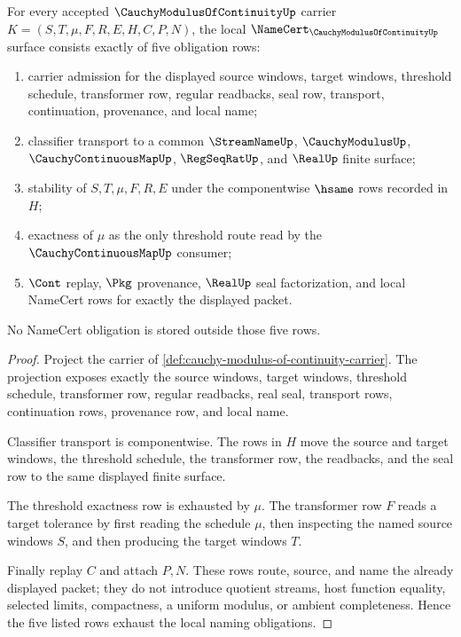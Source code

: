\begin{theorem}
\label{thm:cauchy-modulus-of-continuity-namecert-obligations}
For every accepted $\CauchyModulusOfContinuityUp$ carrier
$K=(S,T,\mu,F,R,E,H,C,P,N)$, the local
$\NameCert_{\CauchyModulusOfContinuityUp}$ surface consists exactly of five
obligation rows:
\begin{enumerate}
\item carrier admission for the displayed source windows, target windows,
threshold schedule, transformer row, regular readbacks, seal row, transport,
continuation, provenance, and local name;
\item classifier transport to a common $\StreamNameUp$, $\CauchyModulusUp$,
$\CauchyContinuousMapUp$, $\RegSeqRatUp$, and $\RealUp$ finite surface;
\item stability of $S,T,\mu,F,R,E$ under the componentwise $\hsame$ rows
recorded in $H$;
\item exactness of $\mu$ as the only threshold route read by the
$\CauchyContinuousMapUp$ consumer;
\item $\Cont$ replay, $\Pkg$ provenance, $\RealUp$ seal factorization, and
local NameCert rows for exactly the displayed packet.
\end{enumerate}
No NameCert obligation is stored outside those five rows.
\end{theorem}
\begin{proof}
Project the carrier of
\autoref{def:cauchy-modulus-of-continuity-carrier}. The projection exposes
exactly the source windows, target windows, threshold schedule, transformer
row, regular readbacks, real seal, transport rows, continuation rows,
provenance row, and local name.

Classifier transport is componentwise. The rows in $H$ move the source and
target windows, the threshold schedule, the transformer row, the readbacks,
and the seal row to the same displayed finite surface.

The threshold exactness row is exhausted by $\mu$. The transformer row $F$
reads a target tolerance by first reading the schedule $\mu$, then inspecting
the named source windows $S$, and then producing the target windows $T$.

Finally replay $C$ and attach $P,N$. These rows route, source, and name the
already displayed packet; they do not introduce quotient streams, host
function equality, selected limits, compactness, a uniform modulus, or ambient
completeness. Hence the five listed rows exhaust the local naming obligations.
\end{proof}

